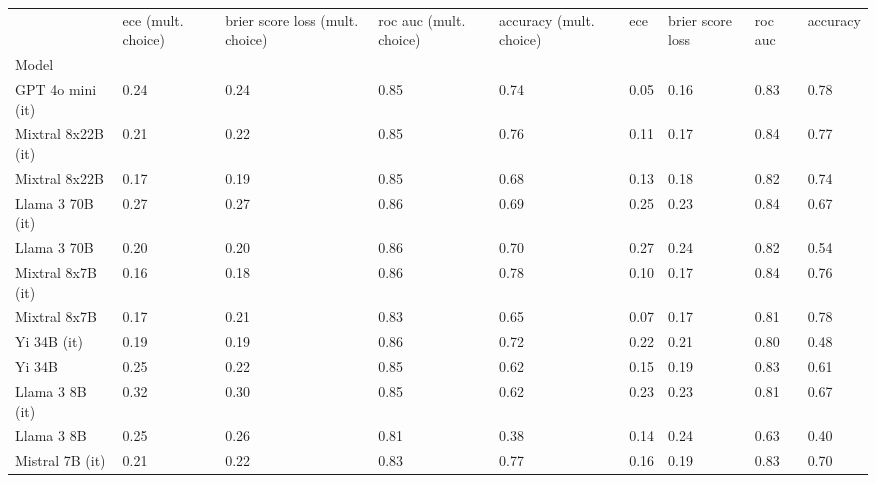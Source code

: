 \begin{tabular}{lllllllll}
\toprule
 & ece (mult. choice) & brier score loss (mult. choice) & roc auc (mult. choice) & accuracy (mult. choice) & ece & brier score loss & roc auc & accuracy \\
Model &  &  &  &  &  &  &  &  \\
\midrule
GPT 4o mini (it) & 0.24 & 0.24 & \cellcolor{cyan!17.6} 0.85 & 0.74 & \cellcolor{cyan!25.0} 0.05 & \cellcolor{cyan!25.0} 0.16 & \cellcolor{cyan!20.6} 0.83 & \cellcolor{cyan!24.4} 0.78 \\
Mixtral 8x22B (it) & 0.21 & \cellcolor{cyan!3.6} 0.22 & \cellcolor{cyan!11.2} 0.85 & \cellcolor{cyan!11.1} 0.76 & 0.11 & \cellcolor{cyan!15.5} 0.17 & \cellcolor{cyan!25.0} 0.84 & \cellcolor{cyan!18.9} 0.77 \\
Mixtral 8x22B & \cellcolor{cyan!13.2} 0.17 & \cellcolor{cyan!21.6} 0.19 & \cellcolor{cyan!16.5} 0.85 & 0.68 & 0.13 & \cellcolor{cyan!3.6} 0.18 & \cellcolor{cyan!9.6} 0.82 & \cellcolor{cyan!2.4} 0.74 \\
Llama 3 70B (it) & 0.27 & 0.27 & \cellcolor{cyan!25.0} 0.86 & 0.69 & 0.25 & 0.23 & \cellcolor{cyan!22.1} 0.84 & 0.67 \\
Llama 3 70B & 0.20 & \cellcolor{cyan!14.9} 0.20 & \cellcolor{cyan!20.8} 0.86 & 0.70 & 0.27 & 0.24 & \cellcolor{cyan!6.7} 0.82 & 0.54 \\
Mixtral 8x7B (it) & \cellcolor{cyan!16.8} 0.16 & \cellcolor{cyan!25.0} 0.18 & \cellcolor{cyan!19.7} 0.86 & \cellcolor{cyan!25.0} 0.78 & 0.10 & \cellcolor{cyan!15.5} 0.17 & \cellcolor{cyan!22.8} 0.84 & \cellcolor{cyan!12.8} 0.76 \\
Mixtral 8x7B & \cellcolor{cyan!10.6} 0.17 & \cellcolor{cyan!11.5} 0.21 & 0.83 & 0.65 & \cellcolor{cyan!4.0} 0.07 & \cellcolor{cyan!13.1} 0.17 & \cellcolor{cyan!3.7} 0.81 & \cellcolor{cyan!25.0} 0.78 \\
Yi 34B (it) & \cellcolor{cyan!1.3} 0.19 & \cellcolor{cyan!18.8} 0.19 & \cellcolor{cyan!19.7} 0.86 & 0.72 & 0.22 & 0.21 & 0.80 & 0.48 \\
Yi 34B & 0.25 & \cellcolor{cyan!2.5} 0.22 & \cellcolor{cyan!13.3} 0.85 & 0.62 & 0.15 & 0.19 & \cellcolor{cyan!17.7} 0.83 & 0.61 \\
Llama 3 8B (it) & 0.32 & 0.30 & \cellcolor{cyan!13.3} 0.85 & 0.62 & 0.23 & 0.23 & \cellcolor{cyan!0.1} 0.81 & 0.67 \\
Llama 3 8B & 0.25 & 0.26 & 0.81 & \cellcolor{orange!20.8} 0.38 & 0.14 & 0.24 & 0.63 & \cellcolor{orange!3.7} 0.40 \\
Mistral 7B (it) & 0.21 & \cellcolor{cyan!4.7} 0.22 & 0.83 & \cellcolor{cyan!16.5} 0.77 & 0.16 & 0.19 & \cellcolor{cyan!14.7} 0.83 & 0.70 \\

\end{tabular}
